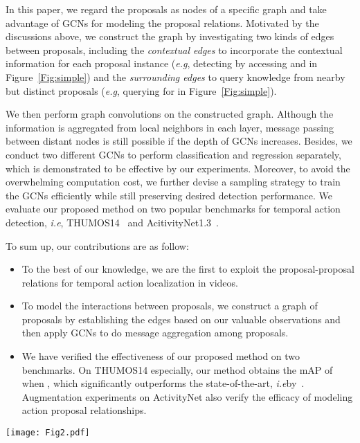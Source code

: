 \documentclass[10pt,twocolumn,letterpaper]{article}
\def\eg{\emph{e.g}\onedot} \def\Eg{\emph{E.g}\onedot}
\def\ie{\emph{i.e}\onedot} \def\Ie{\emph{I.e}\onedot}
\begin{document}
	In this paper, we regard the proposals as nodes of a specific graph and take advantage of GCNs for modeling the proposal relations. Motivated by the discussions above, we construct the graph by investigating two kinds of edges between proposals, including the \emph{contextual edges} to incorporate the contextual information for each proposal instance (\eg, detecting  by accessing  and  in Figure~\ref{Fig:simple}) and the \emph{surrounding edges} to query knowledge from nearby but distinct proposals (\eg, querying  for  in Figure~\ref{Fig:simple}). 
	
	We then perform graph convolutions on the constructed graph. Although the information is aggregated from local neighbors in each layer,
message passing between distant nodes is still possible if the depth of GCNs increases. Besides, we conduct two different GCNs to perform classification and regression separately, which is demonstrated to be effective by our experiments. Moreover, to avoid the overwhelming computation cost, we further devise a sampling strategy to train the GCNs efficiently while still preserving desired detection performance. We evaluate our proposed method on two popular benchmarks for temporal action detection, \ie, THUMOS14~\cite{jiang2014thumos} and AcitivityNet1.3~\cite{caba2015activitynet}.
	
	To sum up, our contributions are as follow:
\begin{itemize}
		\item To the best of our knowledge, we are the first to exploit the proposal-proposal relations for temporal action localization in videos.
\item  To model the interactions between proposals, we construct a graph of proposals by establishing the edges based on our valuable observations and then apply GCNs to do message aggregation among proposals.
\item We have verified the effectiveness of our proposed method on two benchmarks. On THUMOS14 especially, our method obtains the mAP of  when , which significantly outperforms the state-of-the-art, \ie  by~\cite{chao2018rethinking}. Augmentation experiments on ActivityNet also verify the efficacy of modeling action proposal relationships.
	\end{itemize}




	\begin{figure*}[!t]
		\centering
		\texttt{[image: Fig2.pdf]}
		\caption{Schematic of our P-GCN model. Given a set of proposals from the input untrimmed video, we instantiate the nodes in the graph by each proposal. Then, edges are established among nodes to model the relations between proposals. We employ two separate GCNs on the same constructed graph with different input features (\ie, the original feature and the extended feature). Finally, P-GCN model outputs the predicted action category, completeness and boundary regression results for all proposals simultaneously.}
		\label{Fig:framework}
\end{figure*}
	
\end{document}
